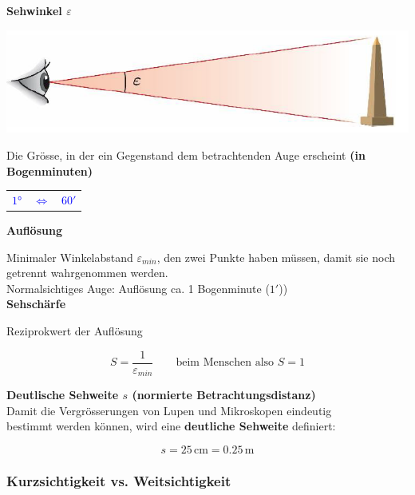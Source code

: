 \textbf{Sehwinkel $\varepsilon$}

\begin{minipage}{0.48\linewidth}
\includegraphics[width=0.9\linewidth]{Bilder/Wellen-Optik/sehwinkel}
\end{minipage}
\hfill
\begin{minipage}{0.48\linewidth}
Die Grösse, in der ein Gegenstand dem betrachtenden Auge erscheint \textbf{(in Bogenminuten)} \\

\begin{tabular}{l c l}
\textcolor{blue}{$1$°} & \textcolor{blue}{$\Leftrightarrow$} & \textcolor{blue}{$60'$} \\
\end{tabular}

\end{minipage}



\textbf{Auflösung} 

Minimaler Winkelabstand $\varepsilon _{min}$, den zwei Punkte haben müssen, damit sie noch getrennt wahrgenommen werden. \\
Normalsichtiges Auge: Auflösung ca. 1 Bogenminute ($1'$))\\


\textbf{Sehschärfe}

Reziprokwert der Auflösung

$$ \boxed{ S = \frac{1}{\varepsilon _{min}} \qquad \text{beim Menschen also } S = 1  } $$ 



\textbf{Deutlische Sehweite  $s$ (normierte Betrachtungsdistanz)} \\

Damit die Vergrösserungen von Lupen und Mikroskopen eindeutig \\
bestimmt werden können, wird eine \textbf{deutliche Sehweite} definiert:

$$ \boxed{ s = 25 \, \mathrm{cm} = 0.25 \, \mathrm{m}  } $$ 




\subsubsection{Kurzsichtigkeit vs. Weitsichtigkeit}


